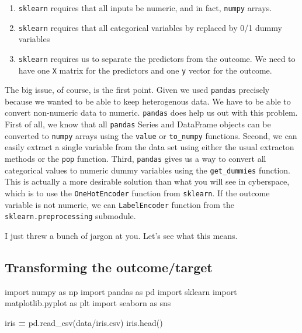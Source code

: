 \documentclass[
  letterpaper,
]{scrbook}
\newenvironment{Shaded}{\begin{snugshade}}{\end{snugshade}}
\newcommand{\ImportTok}[1]{#1}
\newcommand{\NormalTok}[1]{#1}
\newcommand{\OperatorTok}[1]{\textcolor[rgb]{0.81,0.36,0.00}{\textbf{#1}}}
\newcommand{\StringTok}[1]{\textcolor[rgb]{0.31,0.60,0.02}{#1}}
\providecommand{\tightlist}{%
  \setlength{\itemsep}{0pt}\setlength{\parskip}{0pt}}
\begin{document}
\begin{enumerate}
\def\labelenumi{\arabic{enumi}.}
\tightlist
\item
  \texttt{sklearn} requires that all inputs be numeric, and in fact, \texttt{numpy} arrays.
\item
  \texttt{sklearn} requires that all categorical variables by replaced by 0/1 dummy variables
\item
  \texttt{sklearn} requires us to separate the predictors from the outcome. We need to have one \texttt{X} matrix for the predictors and one \texttt{y} vector for the outcome.
\end{enumerate}

The big issue, of course, is the first point. Given we used \texttt{pandas} precisely because we wanted to be able to keep heterogenous data. We have to be able to convert non-numeric data to numeric. \texttt{pandas} does help us out with this problem. First of
all, we know that all \texttt{pandas} Series and DataFrame objects can be converted to \texttt{numpy} arrays using the \texttt{value} or \texttt{to\_numpy} functions. Second, we can easily extract a single variable from the data set using either the usual extracton methods or the
\texttt{pop} function. Third, \texttt{pandas} gives us a way to convert all categorical values to numeric dummy variables using the \texttt{get\_dummies} function. This is actually a more desirable solution than what you will see in cyberspace, which is to use the
\texttt{OneHotEncoder} function from \texttt{sklearn}. If the outcome variable is not numeric, we can \texttt{LabelEncoder} function from the \texttt{sklearn.preprocessing} submodule.

I just threw a bunch of jargon at you. Let's see what this means.

\hypertarget{transforming-the-outcometarget}{%
\subsection{Transforming the outcome/target}\label{transforming-the-outcometarget}}

\begin{Shaded}
\begin{Highlighting}[]
\ImportTok{import}\NormalTok{ numpy }\ImportTok{as}\NormalTok{ np}
\ImportTok{import}\NormalTok{ pandas }\ImportTok{as}\NormalTok{ pd}
\ImportTok{import}\NormalTok{ sklearn}
\ImportTok{import}\NormalTok{ matplotlib.pyplot }\ImportTok{as}\NormalTok{ plt}
\ImportTok{import}\NormalTok{ seaborn }\ImportTok{as}\NormalTok{ sns}

\NormalTok{iris }\OperatorTok{=}\NormalTok{ pd.read\_csv(}\StringTok{\textquotesingle{}data/iris.csv\textquotesingle{}}\NormalTok{)}
\NormalTok{iris.head()}
\end{Highlighting}
\end{Shaded}
\end{document}
